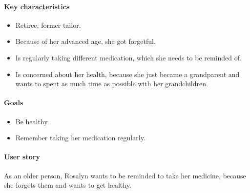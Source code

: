 \documentclass[conference]{IEEEtran}
\begin{document}
\paragraph*{Key characteristics}
\begin{itemize}[leftmargin=1.25cm]
	\item Retiree, former tailor.
	\item Because of her advanced age, she got forgetful.
	\item Is regularly taking different medication, which she needs to be reminded of.
	\item Is concerned about her health, because she just became a grandparent and wants to spent as much time as possible with her grandchildren.
\end{itemize}

\paragraph*{Goals}
\begin{itemize}[leftmargin=1.25cm]
	\item Be healthy.
	\item Remember taking her medication regularly.
\end{itemize}

\paragraph*{User story}
As an older person, Rosalyn wants to be reminded to take her medicine, because she forgets them
and wants to get healthy.
\end{document}
